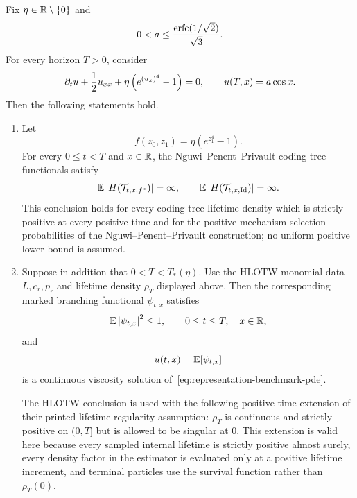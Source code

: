 \begin{theorem}
\label{thm:representation-dichotomy}
Fix $\eta\in\mathbb R\setminus\{0\}$ and
\begin{equation*}
  0<a\leq
  \frac{\operatorname{erfc}(1/\sqrt2)}{\sqrt3}.
\end{equation*}
For every horizon $T>0$, consider
\begin{equation}
  \partial_tu+\frac12u_{xx}
  +\eta\left(e^{(u_x)^4}-1\right)=0,
  \qquad
  u(T,x)=a\cos x.
  \label{eq:representation-benchmark-pde}
\end{equation}
Then the following statements hold.

\begin{enumerate}[label=\textup{(\roman*)}]
\item Let
\begin{equation*}
  f(z_0,z_1)=\eta(e^{z_1^4}-1).
\end{equation*}
For every $0\leq t<T$ and $x\in\mathbb R$, the Nguwi--Penent--Privault coding-tree functionals satisfy
\begin{equation*}
  \mathbb E\left|H(\mathcal T_{t,x,f^*})\right|=\infty,
  \qquad
  \mathbb E\left|H(\mathcal T_{t,x,\operatorname{Id}})\right|=\infty.
\end{equation*}
This conclusion holds for every coding-tree lifetime density which is strictly positive at every positive time and for the positive mechanism-selection probabilities of the Nguwi--Penent--Privault construction; no uniform positive lower bound is assumed.

\item Suppose in addition that $0<T<T_*(\eta)$. Use the HLOTW monomial data $L,c_r,p_r$ and lifetime density $\rho_T$ displayed above. Then the corresponding marked branching functional $\psi_{t,x}$ satisfies
\begin{equation*}
  \mathbb E\left|\psi_{t,x}\right|^2\leq1,
  \qquad
  0\leq t\leq T,
  \quad x\in\mathbb R,
\end{equation*}
and
\begin{equation*}
  u(t,x)=\mathbb E[\psi_{t,x}]
\end{equation*}
is a continuous viscosity solution of~\eqref{eq:representation-benchmark-pde}.

The HLOTW conclusion is used with the following positive-time extension of their printed lifetime regularity assumption: $\rho_T$ is continuous and strictly positive on $(0,T]$ but is allowed to be singular at $0$. This extension is valid here because every sampled internal lifetime is strictly positive almost surely, every density factor in the estimator is evaluated only at a positive lifetime increment, and terminal particles use the survival function rather than $\rho_T(0)$.
\end{enumerate}
\end{theorem}

